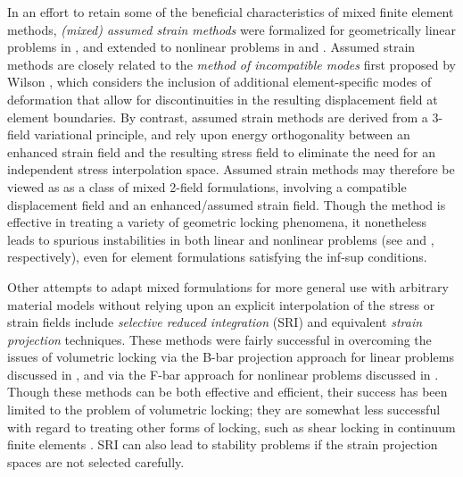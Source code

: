 		In an effort to retain some of the beneficial characteristics of mixed finite element methods, \textit{(mixed) assumed strain methods} were formalized for geometrically linear problems in \cite{Simo&Rifai:90}, and extended to nonlinear problems in \cite{Simo&Armero:92} and \cite{Simo&Armero&Taylor:93}. Assumed strain methods are closely related to the \textit{method of incompatible modes} first proposed by Wilson \cite{Wilson:73}, which considers the inclusion of additional element-specific modes of deformation that allow for discontinuities in the resulting displacement field at element boundaries. By contrast, assumed strain methods are derived from a 3-field variational principle, and rely upon energy orthogonality between an enhanced strain field and the resulting stress field to eliminate the need for an independent stress interpolation space. Assumed strain methods may therefore be viewed as as a class of mixed 2-field formulations, involving a compatible displacement field and an enhanced/assumed strain field. Though the method is effective in treating a variety of geometric locking phenomena, it nonetheless leads to spurious instabilities in both linear and nonlinear problems (see \cite{Bathe&Sussman:14} and \cite{Bathe&Pantuso:97}, respectively), even for element formulations satisfying the inf-sup conditions.
			
		Other attempts to adapt mixed formulations for more general use with arbitrary material models without relying upon an explicit interpolation of the stress or strain fields include \textit{selective reduced integration} (SRI) and equivalent \textit{strain projection} techniques. These methods were fairly successful in overcoming the issues of volumetric locking via the B-bar projection approach for linear problems discussed in \cite{Hughes:00}, and via the F-bar approach for nonlinear problems discussed in \cite{Souza:96}. Though these methods can be both effective and efficient, their success has been limited to the problem of volumetric locking; they are somewhat less successful with regard to treating other forms of locking, such as shear locking in continuum finite elements \cite{Malkus&Hughes:78}. SRI can also lead to stability problems if the strain projection spaces are not selected carefully.
		
